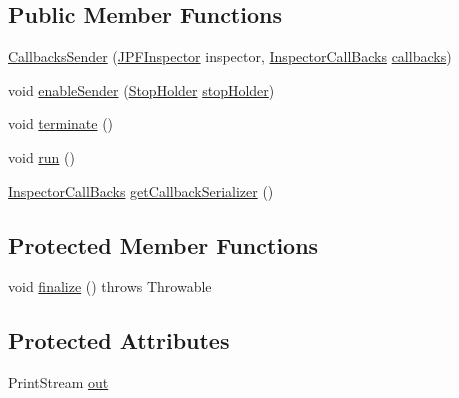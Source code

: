 \subsection*{Public Member Functions}
\begin{DoxyCompactItemize}
\item 
\hyperlink{classgov_1_1nasa_1_1jpf_1_1inspector_1_1server_1_1callbacks_1_1_callbacks_sender_a1e2131a3c9aa9cb6982a33c4e9bf3e74}{Callbacks\+Sender} (\hyperlink{classgov_1_1nasa_1_1jpf_1_1inspector_1_1server_1_1jpf_1_1_j_p_f_inspector}{J\+P\+F\+Inspector} inspector, \hyperlink{interfacegov_1_1nasa_1_1jpf_1_1inspector_1_1interfaces_1_1_inspector_call_backs}{Inspector\+Call\+Backs} \hyperlink{classgov_1_1nasa_1_1jpf_1_1inspector_1_1server_1_1callbacks_1_1_callbacks_sender_aacb11282361096d47169bc5010803c75}{callbacks})
\item 
void \hyperlink{classgov_1_1nasa_1_1jpf_1_1inspector_1_1server_1_1callbacks_1_1_callbacks_sender_a8e56c3c8120684a739b4e4016a8e4c79}{enable\+Sender} (\hyperlink{classgov_1_1nasa_1_1jpf_1_1inspector_1_1server_1_1jpf_1_1_stop_holder}{Stop\+Holder} \hyperlink{classgov_1_1nasa_1_1jpf_1_1inspector_1_1server_1_1callbacks_1_1_callbacks_sender_a3c4071a546588209852c336b484a378e}{stop\+Holder})
\item 
void \hyperlink{classgov_1_1nasa_1_1jpf_1_1inspector_1_1server_1_1callbacks_1_1_callbacks_sender_a20d044bf76401925ef1aacec26307e7d}{terminate} ()
\item 
void \hyperlink{classgov_1_1nasa_1_1jpf_1_1inspector_1_1server_1_1callbacks_1_1_callbacks_sender_a8eb8366d2cca8ff1482e9470e202fab7}{run} ()
\item 
\hyperlink{interfacegov_1_1nasa_1_1jpf_1_1inspector_1_1interfaces_1_1_inspector_call_backs}{Inspector\+Call\+Backs} \hyperlink{classgov_1_1nasa_1_1jpf_1_1inspector_1_1server_1_1callbacks_1_1_callbacks_sender_a1ba297f759449ddcc2efad71676756ff}{get\+Callback\+Serializer} ()
\end{DoxyCompactItemize}
\subsection*{Protected Member Functions}
\begin{DoxyCompactItemize}
\item 
void \hyperlink{classgov_1_1nasa_1_1jpf_1_1inspector_1_1server_1_1callbacks_1_1_callbacks_sender_ae8ff9e4a3c50f8c2d6ed7b329ee893dd}{finalize} ()  throws Throwable 
\end{DoxyCompactItemize}
\subsection*{Protected Attributes}
\begin{DoxyCompactItemize}
\item 
Print\+Stream \hyperlink{classgov_1_1nasa_1_1jpf_1_1inspector_1_1server_1_1callbacks_1_1_callbacks_sender_a55e47f1fd77417732cce3c607672644f}{out}
\end{DoxyCompactItemize}
